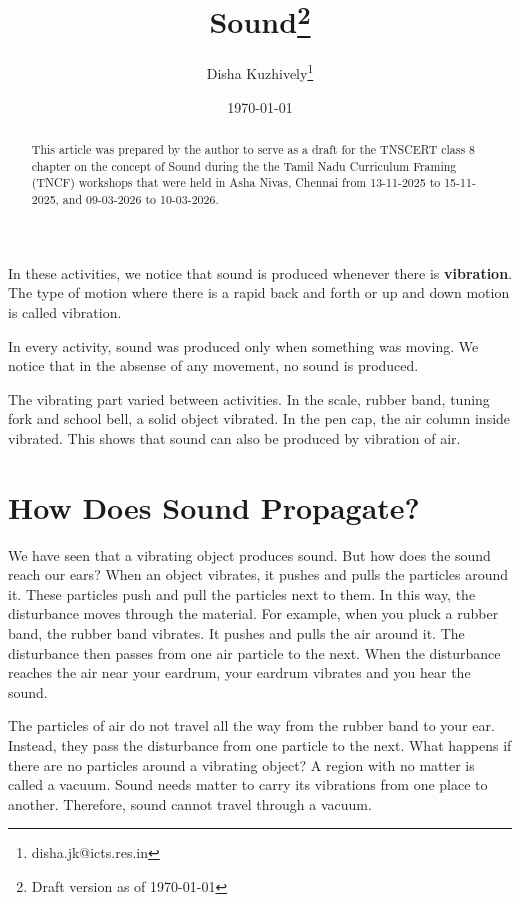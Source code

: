 \documentclass{xtufte-handout}
\title{Sound\thanks{Draft version as of \today}}
\author{Disha Kuzhively\thanks{disha.jk@icts.res.in}}
\date{\today}
\begin{document}
\maketitle

\begin{abstract}
\noindent
This article was prepared by the author to serve as a draft for the TNSCERT class 8 chapter on the concept of Sound during the the Tamil Nadu Curriculum Framing (TNCF) workshops that were held in Asha Nivas, Chennai from 13-11-2025 to 15-11-2025, and 09-03-2026 to 10-03-2026.
\end{abstract}






In these activities, we notice that sound is produced whenever there is \textbf{vibration}. The type of motion where there is a rapid back and forth or up and down motion is called vibration.



In every activity, sound was produced only when something was moving. We notice that in the absense of any movement, no sound is produced.



The vibrating part varied between activities.  In the scale, rubber band, tuning fork and school bell, a solid object vibrated.  In the pen cap, the air column inside vibrated. This shows that sound can also be produced by vibration of air.




\section{How Does Sound Propagate?}
We have seen that a vibrating object produces sound. But how does the sound reach our ears? When an object vibrates, it pushes and pulls the particles around it. These particles push and pull the particles next to them. In this way, the disturbance moves through the material. For example, when you pluck a rubber band, the rubber band vibrates. It pushes and pulls the air around it. The disturbance then passes from one air particle to the next. When the disturbance reaches the air near your eardrum, your eardrum vibrates and you hear the sound.

The particles of air do not travel all the way from the rubber band to your ear. Instead, they pass the disturbance from one particle to the next. What happens if there are no particles around a vibrating object? A region with no matter is called a vacuum. Sound needs matter to carry its vibrations from one place to another. Therefore, sound cannot travel through a vacuum.
\end{document}
